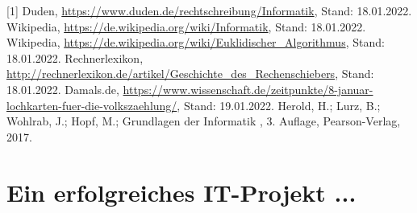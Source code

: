 \documentclass[12pt]{scrartcl}
\begin{document}
[1] Duden, \url{https://www.duden.de/rechtschreibung/Informatik}, Stand: 18.01.2022.
\newline
[2] Wikipedia, \url{https://de.wikipedia.org/wiki/Informatik}, Stand: 18.01.2022.
\newline
[3] Wikipedia, \url{https://de.wikipedia.org/wiki/Euklidischer_Algorithmus}, Stand: 18.01.2022.
\newline
[4] Rechnerlexikon, \url{http://rechnerlexikon.de/artikel/Geschichte_des_Rechenschiebers}, Stand: 18.01.2022.
\newline
[5] Damals.de, \url{https://www.wissenschaft.de/zeitpunkte/8-januar-lochkarten-fuer-die-volkszaehlung/}, Stand: 19.01.2022.
\newline
[6] Herold, H.; Lurz, B.; Wohlrab, J.; Hopf, M.; \glqq Grundlagen der Informatik \grqq , 3. Auflage, Pearson-Verlag, 2017.

\newpage



\section{Ein erfolgreiches IT-Projekt ...}
\end{document}
